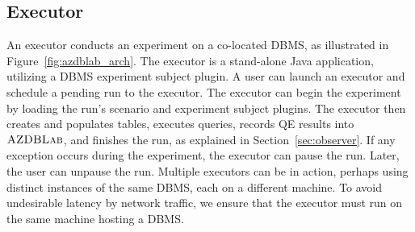 \documentclass{vldb}
\def\azdb{\hbox{\sc AZDBLab}}
\begin{document}

\subsection{Executor}\label{sec:executor}
An executor \hbox{conducts} an experiment on a co-located \linebreak \hbox{DBMS}, as illustrated in Figure~\ref{fig:azdblab_arch}. 
The executor is a stand-alone Java application, utilizing a \hbox{DBMS} experiment \hbox{subject} plugin. 
A user can launch an executor and schedule a \linebreak \hbox{pending} run to the executor. 
The executor can begin the \hbox{experiment} by \hbox{loading} the run's scenario and experiment subject \hbox{plugins}. 
The \hbox{executor} then creates and populates tables, executes queries, records QE results into $\azdb$, and finishes the run, 
as explained in \hbox{Section~\ref{sec:observer}}. 
If any \hbox{exception} occurs during the \hbox{experiment}, the executor can pause the run. Later, the user can unpause the run. 
\hbox{Multiple} executors can be in action, perhaps using distinct instances of the same \hbox{DBMS}, 
each on a different \hbox{machine}. 
To avoid \linebreak \hbox{undesirable} latency by network traffic, we ensure that the executor must run on the same machine hosting a \hbox{DBMS}. 

\end{document}
